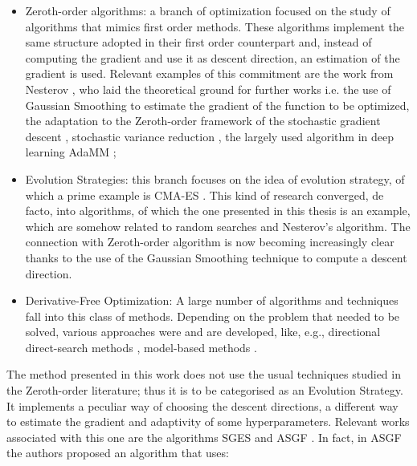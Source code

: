 \begin{itemize}
	
    \item Zeroth-order algorithms: a branch of optimization focused on the study of algorithms that mimics first order methods. These algorithms implement the same structure adopted in their first order counterpart and, instead of computing the gradient and use it as descent direction, an estimation of the gradient is used. Relevant examples of this commitment are the work from Nesterov \cite{nesterov2017random}, who laid the theoretical ground for further works i.e. the use of Gaussian Smoothing to estimate the gradient of the function to be optimized, the adaptation to the Zeroth-order framework of the stochastic gradient descent \cite{Ghadimi2013}, stochastic variance reduction \cite{Liu2018a}, the largely used algorithm in deep learning AdaMM \cite{Chen2019};
    \item Evolution Strategies: this branch focuses on the idea of evolution strategy, of which a prime example is CMA-ES \cite{542381}. This kind of research converged, de facto, into algorithms, of which the one presented in this thesis is an example, which are somehow related to random searches and Nesterov's algorithm. The connection with Zeroth-order algorithm is now becoming increasingly clear thanks to the use of the Gaussian Smoothing technique to compute a descent direction.
    \item Derivative-Free Optimization: A large number of algorithms and techniques fall into this class of methods. Depending on the problem that needed to be solved, various approaches were and are developed, like, e.g., directional direct-search methods \cite{Larson2019}, model-based methods \cite{10.1093/imanum/drn045, custódio_vicente_2007}.
    
\end{itemize}
The method presented in this work does not use the usual techniques studied in the Zeroth-order literature; thus it is to be categorised as an Evolution Strategy. It implements a peculiar way of choosing the descent directions, a different way to estimate the gradient and adaptivity of some hyperparameters. Relevant works associated with this one are the algorithms SGES \cite{Liu2020a} and ASGF \cite{Dereventsov2020}.
In fact, in ASGF the authors proposed an algorithm that uses:

